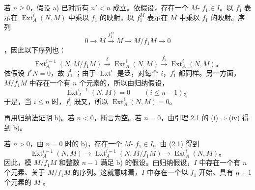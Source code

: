 若 $n\ge0$，假设 a) 已对所有 $n'<n$ 成立。依假设，存在一个 $M$- $f_1\in I$。以 $f_1^i$ 表示在 $\operatorname{Ext}_A^i(N,M)$ 中乘以 $f_1$ 的映射，以 $f_1^M$ 表示在 $M$ 中乘以 $f_1$ 的映射。序列
\[
0\longrightarrow M\xrightarrow{f_1^M}M
\longrightarrow M/f_1M\longrightarrow0\tag{2.1}
\]
，因此以下序列也：
\[
\operatorname{Ext}_A^{i-1}(N,M/f_1M)
\xrightarrow{\delta}\operatorname{Ext}_A^i(N,M)
\xrightarrow{f_1^i}\operatorname{Ext}_A^i(N,M)。
\]
依假设 $I^rN=0$，故 $f_1^0$ ；由于 $\operatorname{Ext}^i$ 是泛，对每个 $i$，$f_1^i$ 都同样。另一方面，$M/f_1M$ 中存在一个有 $n$ 个元素的，所以由归纳假设，
\[
\operatorname{Ext}_A^{i-1}(N,M)=0\qquad(i\le n-1)。
\]
于是，当 $i\le n$ 时，$f_1^i$ 既又，所以 $\operatorname{Ext}_A^i(N,M)=0$。

再用归纳法证明 b)。若 $n<0$，断言为空。若 $n=0$，由引理 2.1 的 (i)$\Rightarrow$(iv) 得到 b)。

若 $n>0$，由 $n=0$ 时的 b)，存在一个 $M$- $f_1\in I$。由 (2.1) 得到
\[
\operatorname{Ext}_A^{i-1}(N,M)
\longrightarrow\operatorname{Ext}_A^{i-1}(N,M/f_1M)
\longrightarrow\operatorname{Ext}_A^i(N,M)。\tag{2.2}
\]
因此，模 $M/f_1M$ 和整数 $n-1$ 满足 b) 的假设。由归纳假设，$I$ 中存在一个有 $n$ 个元素、关于 $M/f_1M$ 的序列。这就意味着，$I$ 中存在一个以 $f_1$ 开始、具有 $n+1$ 个元素的 $M$-。

